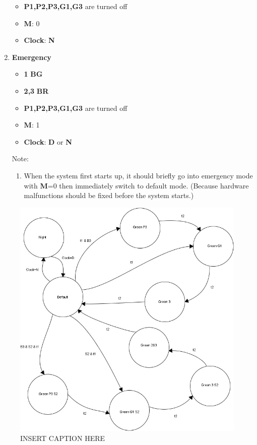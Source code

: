 \documentclass[letterpaper]{article}
\begin{document}
\begin{enumerate}
\begin{itemize}
        \item \textbf{P1,P2,P3,G1,G3} are turned off
        \item \textbf{M}: 0
        \item \textbf{Clock}: \textbf{N}
       \end{itemize}
 \item \textbf{Emergency}
       \begin{itemize}
        \item {\color{green}\textbf{1}} \textbf{BG}
        \item {\color{red}\textbf{2,3}} \textbf{BR}
        \item \textbf{P1,P2,P3,G1,G3} are turned off
        \item \textbf{M}: 1
        \item \textbf{Clock}: \textbf{D} or \textbf{N}
       \end{itemize}
       Note:
       \begin{enumerate}
        \item When the system first starts up, it should briefly go into emergency mode
              with \textbf{M}=0 then immediately switch to default mode.
              (Because hardware malfunctions should be fixed before the system starts.)
       \end{enumerate}
\end{enumerate}

\begin{figure}[H]
 \centering
 \includegraphics[width=\textwidth]{fsm.jpg}
 \caption{INSERT CAPTION HERE}
 \label{fsm}
\end{figure}
\end{document}
